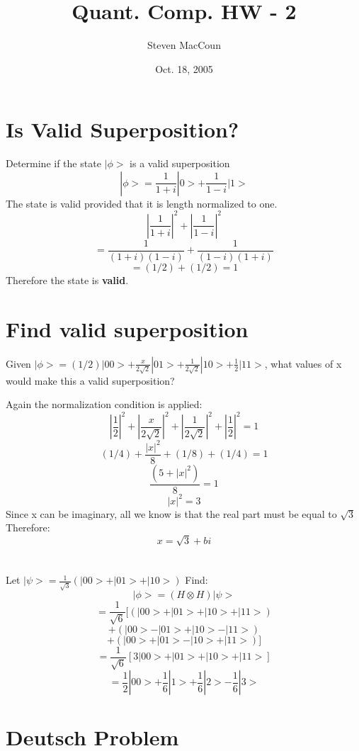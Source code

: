 \documentclass[12pt]{article}
\title{Quant. Comp. HW - 2}
\author{Steven MacCoun}
\date{Oct. 18, 2005}
\begin{document}
\maketitle						%



\section{Is Valid Superposition?}

Determine if the state $|\phi>$ is a valid superposition $$|\phi> = \frac{1}{1+i} |0> + \frac{1}{1-i}|1>$$
The state is valid provided that  it is length normalized to one.
$$|\frac{1}{1+i}|^2 + |\frac{1}{1-i}|^2$$ 
$$= \frac{1}{(1+i)(1-i)} + \frac{1}{(1-i)(1+i)}$$
$$= (1/2) + (1/2) = 1$$
Therefore the state is \textbf{valid}.

\section{Find valid superposition}

Given $|\phi> = (1/2)|00> + \frac{x}{2 \sqrt{2}}|01> + \frac{1}{2 \sqrt{2}}|10> +  \frac{1}{2}|11>$, what values of x would make this a valid superposition?

Again the normalization condition is applied:
$$|\frac{1}{2}|^{2} + |\frac{x}{2 \sqrt{2}}|^2 + |\frac{1}{2 \sqrt{2}}|^2 +  |\frac{1}{2}|^2 = 1$$
$$(1/4) + \frac{|x|^2}{8} + (1/8) + (1/4) = 1$$
$$\frac{(5 + |x|^2)}{8} = 1$$
$$|x|^2 = 3$$
Since x can be imaginary, all we know is that the real part must be equal to $\sqrt{3}$
Therefore:
\[
\boxed{x = \sqrt{3} + bi}
\]
\section{}

Let $|\psi> = \frac{1}{\sqrt{3}}(|00> + |01> + |10>)$
Find:
$$|\phi> = (H \otimes H)|\psi>$$
$$ =  \frac{1}{\sqrt{6}}[(|00> + |01> + |10> + |11>)$$$$ + (|00> - |01> + |10> - |11>) $$$$+ (|00> + |01> - |10> + |11>)]$$
$$ =  \frac{1}{\sqrt{6}}[3|00>+ |01> + |10> + |11>]$$
\[
\boxed{ = \frac{1}{2}|00> + \frac{1}{6}|1> + \frac{1}{6}|2> - \frac{1}{6}|3>}
\]
\section{Deutsch Problem}
\end{document}
